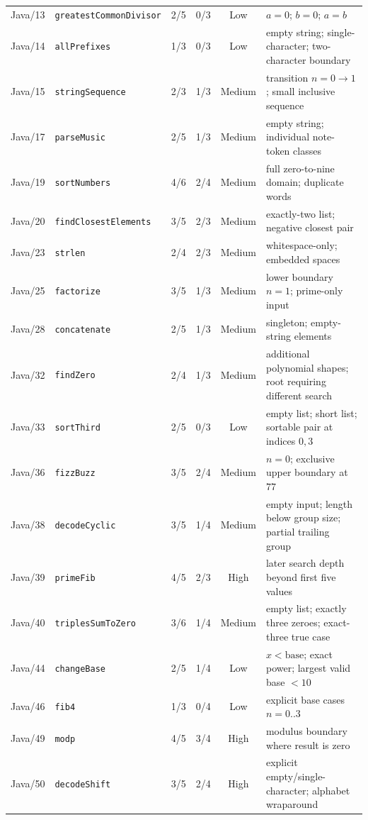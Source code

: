 \documentclass[journal]{IEEEtran}
\begin{document}
\begin{table}[!t]
\begin{tabular}{@{}l l c c c p{}@{}}
Java/13 & \texttt{greatestCommonDivisor}& 2/5 & 0/3 & Low    & $a{=}0$; $b{=}0$; $a{=}b$ \\
Java/14 & \texttt{allPrefixes}          & 1/3 & 0/3 & Low    & empty string; single-character; two-character boundary \\
Java/15 & \texttt{stringSequence}       & 2/3 & 1/3 & Medium & transition $n{=}0\to 1$; small inclusive sequence \\
Java/17 & \texttt{parseMusic}           & 2/5 & 1/3 & Medium & empty string; individual note-token classes \\
Java/19 & \texttt{sortNumbers}          & 4/6 & 2/4 & Medium & full zero-to-nine domain; duplicate words \\
Java/20 & \texttt{findClosestElements}  & 3/5 & 2/3 & Medium & exactly-two list; negative closest pair \\
Java/23 & \texttt{strlen}               & 2/4 & 2/3 & Medium & whitespace-only; embedded spaces \\
Java/25 & \texttt{factorize}            & 3/5 & 1/3 & Medium & lower boundary $n{=}1$; prime-only input \\
Java/28 & \texttt{concatenate}          & 2/5 & 1/3 & Medium & singleton; empty-string elements \\
Java/32 & \texttt{findZero}             & 2/4 & 1/3 & Medium & additional polynomial shapes; root requiring different search \\
Java/33 & \texttt{sortThird}            & 2/5 & 0/3 & Low    & empty list; short list; sortable pair at indices $0,3$ \\
Java/36 & \texttt{fizzBuzz}             & 3/5 & 2/4 & Medium & $n{=}0$; exclusive upper boundary at $77$ \\
Java/38 & \texttt{decodeCyclic}         & 3/5 & 1/4 & Medium & empty input; length below group size; partial trailing group \\
Java/39 & \texttt{primeFib}             & 4/5 & 2/3 & High   & later search depth beyond first five values \\
Java/40 & \texttt{triplesSumToZero}     & 3/6 & 1/4 & Medium & empty list; exactly three zeroes; exact-three true case \\
Java/44 & \texttt{changeBase}           & 2/5 & 1/4 & Low    & $x{<}\text{base}$; exact power; largest valid base $<10$ \\
Java/46 & \texttt{fib4}                 & 1/3 & 0/4 & Low    & explicit base cases $n{=}0..3$ \\
Java/49 & \texttt{modp}                 & 4/5 & 3/4 & High   & modulus boundary where result is zero \\
Java/50 & \texttt{decodeShift}          & 3/5 & 2/4 & High   & explicit empty/single-character; alphabet wraparound \\
\bottomrule
\end{tabular}
\end{table}
\end{document}
